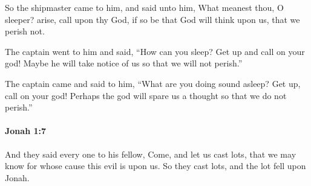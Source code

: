 			\begin{versebox}
					\item[BHS] 
					\item[LXX] 
					\item[ASV] So the shipmaster came to him, and said unto him, What meanest thou, O sleeper? arise, call upon thy God, if so be that God will think upon us, that we perish not.
					\item[NIV] The captain went to him and said, “How can you sleep? Get up and call on your god! Maybe he will take notice of us so that we will not perish.”
					\item[NRSV] The captain came and said to him, “What are you doing sound asleep? Get up, call on your god! Perhaps the god will spare us a thought so that we do not perish.”
			\end{versebox}

		\paragraph{Jonah 1:7} %
			\label{JONAH-1-7}

			And they said every one to his fellow, Come, and let us cast lots, that we may know for whose cause this evil is upon us. So they cast lots, and the lot fell upon Jonah.

